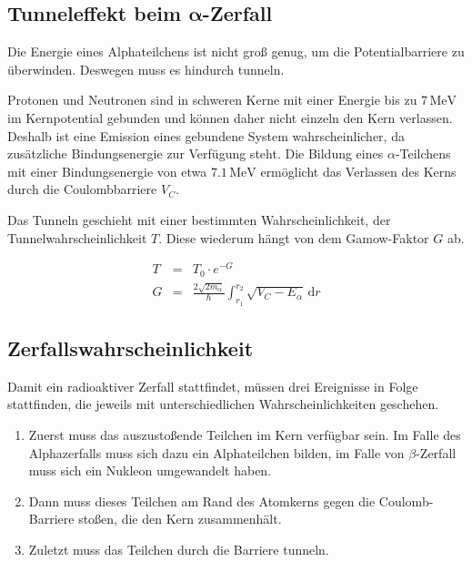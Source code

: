 \documentclass[12pt,a4paper]{scrartcl}
\numberwithin{equation}{section} %
\renewcommand{\[}{} %
\renewcommand{\]}{\noindent} %
\newcommand{\tightlist}{} %
\begin{document}
\hypertarget{tunneleffekt-beim-pmbalpha-zerfall}{%
\subsection{\texorpdfstring{Tunneleffekt beim
$\pmb{\alpha}$-Zerfall}{Tunneleffekt beim \textbackslash pmb\{\textbackslash alpha\}-Zerfall}}\label{tunneleffekt-beim-pmbalpha-zerfall}}

Die Energie eines Alphateilchens ist nicht groß genug, um die
Potentialbarriere zu überwinden. Deswegen muss es hindurch tunneln.

Protonen und Neutronen sind in schweren Kerne mit einer Energie bis zu
$7\mathrm{\,MeV}$ im Kernpotential gebunden und können daher nicht
einzeln den Kern verlassen. Deshalb ist eine Emission eines gebundene
System wahrscheinlicher, da zusätzliche Bindungsenergie zur Verfügung
steht. Die Bildung eines $\alpha$-Teilchens mit einer Bindungsenergie
von etwa $7.1\mathrm{\,MeV}$ ermöglicht das Verlassen des Kerns durch
die Coulombbarriere $V_C$.

Das Tunneln geschieht mit einer bestimmten Wahrscheinlichkeit, der
Tunnelwahrscheinlichkeit $T$. Diese wiederum hängt von dem
Gamow-Faktor $G$ ab.

\[
\begin{eqnarray}
        T &=& T_0 \cdot e^{-G} \\
        G &=&
                \frac{2\sqrt{2m_\alpha}}{\hbar}
                \int_{r_{1}}^{r_{2}}\sqrt{V_{C}-E_{\alpha}}
                \,\mathrm dr
\end{eqnarray}
\]

\hypertarget{zerfallswahrscheinlichkeit}{%
\subsection{Zerfallswahrscheinlichkeit}\label{zerfallswahrscheinlichkeit}}

Damit ein radioaktiver Zerfall stattfindet, müssen drei Ereignisse in
Folge stattfinden, die jeweils mit unterschiedlichen
Wahrscheinlichkeiten geschehen.

\begin{enumerate}
\def\labelenumi{\arabic{enumi}.}
\tightlist
\item
  Zuerst muss das auszustoßende Teilchen im Kern verfügbar sein. Im
  Falle des Alphazerfalls muss sich dazu ein Alphateilchen bilden, im
  Falle von $\beta$-Zerfall muss sich ein Nukleon umgewandelt haben.
\item
  Dann muss dieses Teilchen am Rand des Atomkerns gegen die
  Coulomb-Barriere stoßen, die den Kern zusammenhält.
\item
  Zuletzt muss das Teilchen durch die Barriere tunneln.
\end{enumerate}
\end{document}
